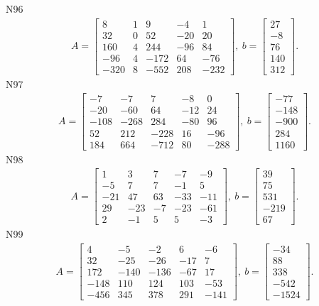 \documentclass[11pt]{report}
\begin{document}
N96
\begin{align*}
 A = \left[\begin{matrix}8 & 1 & 9 & -4 & 1\\32 & 0 & 52 & -20 & 20\\160 & 4 & 244 & -96 & 84\\-96 & 4 & -172 & 64 & -76\\-320 & 8 & -552 & 208 & -232\end{matrix}\right],
\ b = \left[\begin{matrix}27\\-8\\76\\140\\312\end{matrix}\right]. 
 \end{align*}
N97
\begin{align*}
 A = \left[\begin{matrix}-7 & -7 & 7 & -8 & 0\\-20 & -60 & 64 & -12 & 24\\-108 & -268 & 284 & -80 & 96\\52 & 212 & -228 & 16 & -96\\184 & 664 & -712 & 80 & -288\end{matrix}\right],
\ b = \left[\begin{matrix}-77\\-148\\-900\\284\\1160\end{matrix}\right]. 
 \end{align*}
N98
\begin{align*}
 A = \left[\begin{matrix}1 & 3 & 7 & -7 & -9\\-5 & 7 & 7 & -1 & 5\\-21 & 47 & 63 & -33 & -11\\29 & -23 & -7 & -23 & -61\\2 & -1 & 5 & 5 & -3\end{matrix}\right],
\ b = \left[\begin{matrix}39\\75\\531\\-219\\67\end{matrix}\right]. 
 \end{align*}
N99
\begin{align*}
 A = \left[\begin{matrix}4 & -5 & -2 & 6 & -6\\32 & -25 & -26 & -17 & 7\\172 & -140 & -136 & -67 & 17\\-148 & 110 & 124 & 103 & -53\\-456 & 345 & 378 & 291 & -141\end{matrix}\right],
\ b = \left[\begin{matrix}-34\\88\\338\\-542\\-1524\end{matrix}\right]. 
 \end{align*}
\end{document}
